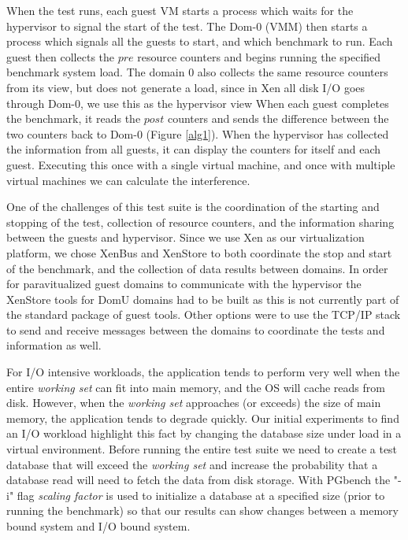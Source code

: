 When the test runs, each guest VM starts a process which waits for the hypervisor to signal the start of the test.  
 The Dom-0 (VMM) then starts a process which signals all the guests to start, and which benchmark to run.  
 Each guest then collects the $pre$ resource counters and begins running the specified benchmark system load.  
 The domain 0 also collects the same resource counters from its view, but does not generate a load, since in Xen all disk I/O goes through Dom-0, we use this as the hypervisor view  
 When each guest completes the benchmark, it reads the $post$ counters and sends the difference between the two counters back to Dom-0 (Figure \ref{alg1}).
 When the hypervisor has collected the information from all guests, it can display the counters for itself and each guest.
 Executing this once with a single virtual machine, and once with multiple virtual machines we can calculate the interference.

One of the challenges of this test suite is the coordination of the starting and stopping of the test, collection of resource counters, and the information sharing between the guests and hypervisor.  
Since we use Xen as our virtualization platform, we chose XenBus and XenStore \cite{xenbus} to both coordinate the stop and start of the benchmark, and the collection of data results between domains.
In order for paravitualized guest domains to communicate with the hypervisor the XenStore tools for DomU domains had to be built as this is not currently part of the standard package of guest tools.  Other options were to use the TCP/IP stack to send and receive messages between the domains to coordinate the tests and information as well.

For I/O intensive workloads, the application tends to perform very well when the entire \emph{working set} can fit into main memory, and the OS will cache reads from disk.
However, when the \emph{working set}  approaches (or exceeds) the size of main memory, the application tends to degrade quickly.  
Our initial experiments to find an I/O workload highlight this fact by changing the database size under load in a virtual environment.
Before running the entire test suite we need to create a test database that will exceed the \emph{working set} and increase the probability that a database read will need to fetch the data from disk storage.  With PGbench the "-i" flag \emph{scaling factor} is used to initialize a database at a specified size (prior to running the benchmark) so that our results can show changes between a memory bound system and I/O bound system.  

